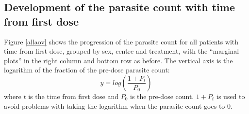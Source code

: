 \subsection{Development of the parasite count with time from first dose}
Figure \ref{allaov} shows the progression of the parasite count for all patients with time from first dose, grouped by sex, centre and treatment, with the ``marginal plots'' in the right column and bottom row as before. The vertical axis is the logarithm of the fraction of the pre-dose parasite count:
$$y=log\left(\frac{1+P_t}{P_0}\right)$$
where $t$ is the time from first dose and $P_0$ is the pre-dose count. $1+P_t$ is used to avoid problems with taking the logarithm when the parasite count goes to 0.

